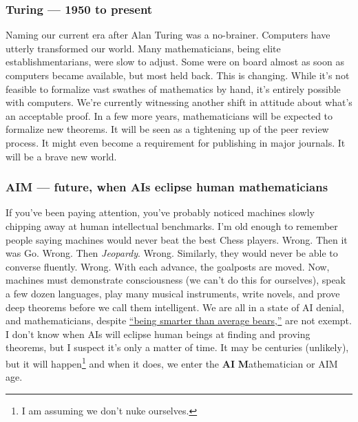 \subsubsection*{Turing --- 1950 to present}%

Naming our current era after Alan Turing was a no-brainer. Computers
have utterly transformed our world. Many mathematicians, being elite
establishmentarians, were slow to adjust. Some were on board almost as
soon as computers became available, but most held back. This is
changing. While it's not feasible to formalize vast swathes of
mathematics by hand, it's entirely possible with computers. We're
currently witnessing another shift in attitude about what's an
acceptable proof. In a few more years, mathematicians will be expected
to formalize new theorems. It will be seen as a tightening up of the
peer review process. It might even become a requirement for publishing
in major journals. It will be a brave new world.

\subsubsection*{AIM --- future, when AIs eclipse human mathematicians}%

If you've been paying attention, you've probably noticed machines
slowly chipping away at human intellectual benchmarks. I'm old enough
to remember people saying machines would never beat the best Chess
players. Wrong. Then it was Go. Wrong. Then \emph{Jeopardy}. Wrong. Similarly,
they would never be able to converse fluently. Wrong. With each
advance, the goalposts are moved. Now, machines must demonstrate consciousness
(we can't do this for ourselves), speak a few dozen languages, play many
musical instruments, write novels, and prove deep theorems before we
call them intelligent. We are all in a state of AI denial, and
mathematicians, despite
\href{https://www.youtube.com/watch?v=CCCx1j8WsHU}{``being smarter than average bears,''}
are not exempt. I don't know when AIs will eclipse human beings at
finding and proving theorems, but I suspect it's only a matter of time.
It may be centuries (unlikely), but it will happen\footnote{I am assuming we don't nuke ourselves.}
and when it does, we enter the \textbf{AI} \textbf{M}athematician or AIM age.

%


%
 
